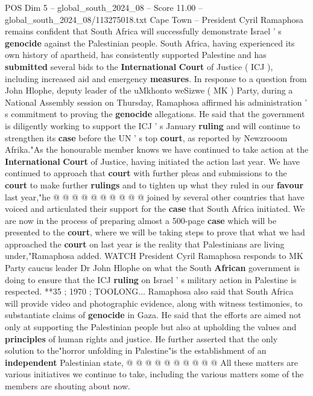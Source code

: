 \begin{textsample}{POS Dim 5 – global\_south\_2024\_08 – Score 11.00 – global\_south\_2024\_08/113275018.txt}  \label{ex:f5_pos_329}
Cape Town -- President Cyril Ramaphosa remains confident that South Africa will successfully demonstrate Israel ' s \textbf{genocide} against the Palestinian people.
South Africa, having experienced its own history of apartheid, has consistently supported Palestine and has \textbf{submitted} several bids to the \textbf{International} \textbf{Court} of Justice ( ICJ ), including increased aid and emergency \textbf{measures}.
In response to a question from John Hlophe, deputy leader of the uMkhonto weSizwe ( MK ) Party, during a National Assembly session on Thursday, Ramaphosa affirmed his administration ' s commitment to proving the \textbf{genocide} allegations.
He said that the government is diligently working to support the ICJ ' s January \textbf{ruling} and will continue to strengthen its \textbf{case} before the UN ' s top \textbf{court}, as reported by Newzrooom Afrika."As the honourable member knows we have continued to take action at the \textbf{International} \textbf{Court} of Justice, having initiated the action last year.
We have continued to approach that \textbf{court} with further pleas and submissions to the \textbf{court} to make further \textbf{rulings} and to tighten up what they ruled in our \textbf{favour} last year,"he @ @ @ @ @ @ @ @ @ @ joined by several other countries that have voiced and articulated their support for the \textbf{case} that South Africa initiated.
We are now in the process of preparing almost a 500-page \textbf{case} which will be presented to the \textbf{court}, where we will be taking steps to prove that what we had approached the \textbf{court} on last year is the reality that Palestinians are living under,"Ramaphosa added.
WATCH President Cyril Ramaphosa responds to MK Party caucus leader Dr John Hlophe on what the South \textbf{African} government is doing to ensure that the ICJ \textbf{ruling} on Israel ' s military action in Palestine is respected. **35 ; 1970 ; TOOLONG...
Ramaphosa also said that South Africa will provide video and photographic evidence, along with witness testimonies, to substantiate claims of \textbf{genocide} in Gaza.
He said that the efforts are aimed not only at supporting the Palestinian people but also at upholding the values and \textbf{principles} of human rights and justice.
He further asserted that the only solution to the"horror unfolding in Palestine"is the establishment of an \textbf{independent} Palestinian state, @ @ @ @ @ @ @ @ @ @ All these matters are various initiatives we continue to take, including the various matters some of the members are shouting about now.

\end{textsample}
